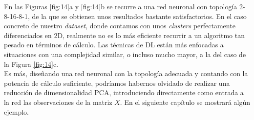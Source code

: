 En las Figuras \ref{fig:14}a y \ref{fig:14}b se recurre a una red neuronal con topología 2-8-16-8-1, de la que se obtienen unos resultados bastante satisfactorios. En el caso concreto de nuestro \textit{dataset}, donde contamos con unos \textit{clusters} perfectamente diferenciados en 2D, realmente no es lo más eficiente recurrir a un algoritmo tan pesado en términos de cálculo. Las técnicas de DL están más enfocadas a situaciones con una complejidad similar, o incluso mucho mayor, a la del caso de la Figura \ref{fig:14}c.\\

Es más, diseñando una red neuronal con la topología adecuada y contando con la potencia de cálculo suficiente, podríamos habernos olvidado de realizar una reducción de dimensionalidad PCA, introduciendo directamente como entrada a la red las observaciones de la matriz $X$. En el siguiente capítulo se mostrará algún ejemplo.
